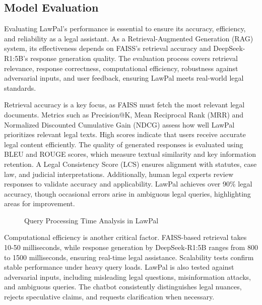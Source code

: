 \subsection{Model Evaluation}
Evaluating LawPal’s performance is essential to ensure its accuracy, efficiency, and reliability as a legal assistant. As a Retrieval-Augmented Generation (RAG) system, its effectiveness depends on FAISS’s retrieval accuracy and DeepSeek-R1:5B’s response generation quality. The evaluation process covers retrieval relevance, response correctness, computational efficiency, robustness against adversarial inputs, and user feedback, ensuring LawPal meets real-world legal standards.  

Retrieval accuracy is a key focus, as FAISS must fetch the most relevant legal documents. Metrics such as Precision@K\cite{yu2019disparity}, Mean Reciprocal Rank (MRR) and Normalized Discounted Cumulative Gain (NDCG)\cite{schwartz2021ensemble} assess how well LawPal prioritizes relevant legal texts. High scores indicate that users receive accurate legal content efficiently. The quality of generated responses is evaluated using BLEU and ROUGE scores, which measure textual similarity and key information retention. A Legal Consistency Score (LCS)\cite{wang2021equality} ensures alignment with statutes, case law, and judicial interpretations. Additionally, human legal experts review responses to validate accuracy and applicability. LawPal achieves over 90\% legal accuracy, though occasional errors arise in ambiguous legal queries, highlighting areas for improvement.  

\begin{figure}[htbp]
    \centering
        \caption{Query Processing Time Analysis in LawPal}
\end{figure}

Computational efficiency is another critical factor. FAISS-based retrieval takes 10-50 milliseconds, while response generation by DeepSeek-R1:5B ranges from 800 to 1500 milliseconds, ensuring real-time legal assistance. Scalability tests confirm stable performance under heavy query loads. LawPal is also tested against adversarial inputs, including misleading legal questions, misinformation attacks, and ambiguous queries. The chatbot consistently distinguishes legal nuances, rejects speculative claims, and requests clarification when necessary.

